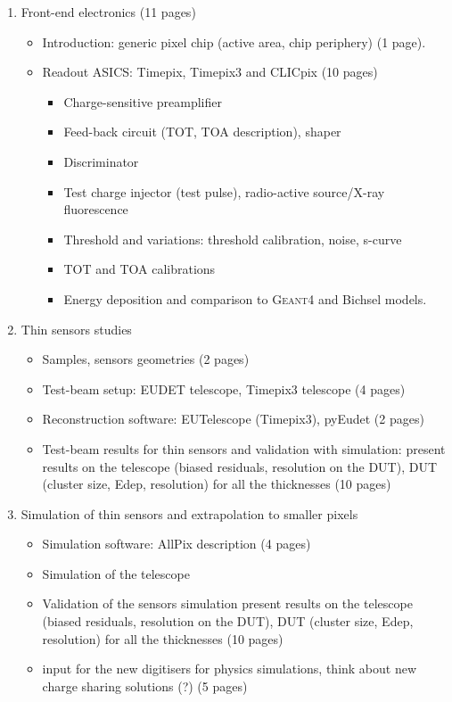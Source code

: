 \begin{enumerate}
\item Front-end electronics (11 pages)
  \begin{itemize}
  \item Introduction: generic pixel chip (active area, chip periphery)
    (1 page).
  \item Readout ASICS: Timepix, Timepix3 and CLICpix (10 pages)
    \begin{itemize}
    \item Charge-sensitive preamplifier
    \item Feed-back circuit (TOT, TOA description), shaper
    \item Discriminator
    \item Test charge injector (test pulse), radio-active source/X-ray fluorescence
    \item Threshold and variations: threshold calibration, noise,
      s-curve
    \item TOT and TOA calibrations
    \item Energy deposition and comparison to \textsc{Geant4} and Bichsel models.
    \end{itemize}
  \end{itemize}

\item Thin sensors studies
  \begin{itemize}
  \item Samples, sensors geometries (2 pages)
  \item Test-beam setup: EUDET telescope, Timepix3 telescope (4 pages)
  \item Reconstruction software: EUTelescope (Timepix3), pyEudet (2
    pages)
  \item Test-beam results for thin sensors and validation with
    simulation: present results on the telescope (biased residuals,
    resolution on the DUT), DUT (cluster size, Edep, resolution) for
    all the thicknesses (10 pages)
  \end{itemize}

\item Simulation of thin sensors and extrapolation to smaller pixels
  \begin{itemize}
  \item Simulation software: AllPix description (4 pages)
  \item Simulation of the telescope
  \item Validation of the sensors simulation present results on the
telescope (biased residuals, resolution on the DUT), DUT (cluster
size, Edep, resolution) for all the thicknesses (10 pages)
  \item input for the new digitisers for physics simulations, think
about new charge sharing solutions (?) (5 pages)
  \end{itemize}


\end{enumerate}
